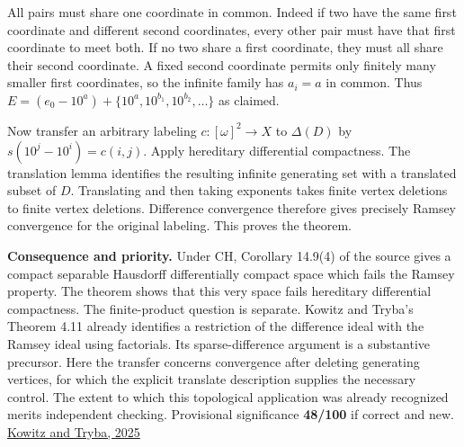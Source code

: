 \documentclass[11pt]{article}
\begin{document}
All pairs must share one coordinate in common. Indeed if two have the same first coordinate and different second coordinates, every other pair must have that first coordinate to meet both. If no two share a first coordinate, they must all share their second coordinate. A fixed second coordinate permits only finitely many smaller first coordinates, so the infinite family has \(a_i=a\) in common. Thus \(E=(e_0-10^a)+\{10^a,10^{b_1},10^{b_2},\ldots\}\) as claimed.

Now transfer an arbitrary labeling \(c:[\omega]^2\to X\) to \(\Delta(D)\) by \(s(10^j-10^i)=c(i,j)\). Apply hereditary differential compactness. The translation lemma identifies the resulting infinite generating set with a translated subset of \(D\). Translating and then taking exponents takes finite vertex deletions to finite vertex deletions. Difference convergence therefore gives precisely Ramsey convergence for the original labeling. This proves the theorem.

\textbf{Consequence and priority.} Under CH, Corollary 14.9(4) of the source gives a compact separable Hausdorff differentially compact space which fails the Ramsey property. The theorem shows that this very space fails hereditary differential compactness. The finite-product question is separate. Kowitz and Tryba's Theorem 4.11 already identifies a restriction of the difference ideal with the Ramsey ideal using factorials. Its sparse-difference argument is a substantive precursor. Here the transfer concerns convergence after deleting generating vertices, for which the explicit translate description supplies the necessary control. The extent to which this topological application was already recognized merits independent checking. Provisional significance \textbf{48/100} if correct and new. \href{https://doi.org/10.1007/s00153-025-00994-1}{Kowitz and Tryba, 2025}
\end{document}
